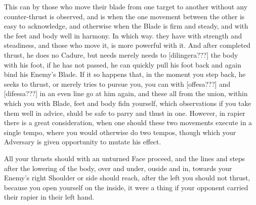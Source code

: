 This can by those who move their blade from one target to another
without any counter-thrust is
observed, and is when the one movement between the other is easy to
acknowledge, and otherwise when the Blade is firm and steady, and with
the feet and body well in harmony. In which way. they have with
strength and steadiness, and those who move it, is more powerful with
it. And after completed thrust, he does no Cadure, but needs merely
needs to [dilingera???] the body with his foot, if he has not passed,
he can quickly pull his foot back and again bind his Enemy's Blade. If
it so happens that, in the moment you step back, he seeks to thrust,
or merely tries to pursue you, you can with [offesa???] and
[difessa???] in an even line go at him again, and these all from the
union, within which you with Blade, feet and body fidn yourself, which
observations if you take them well in advice, shuld be safe to parry
and thust in one. However, in rapier there is a great consideration,
when one should these two movements execute in a single tempo, where
you would otherwise do two tempos, though which your Adversary is
given opportunity to mutate his effect.


All your thrusts should with an unturned Face proceed, and the lines
and steps after the lowering of the body, over and under, ouside and
in, towards your Enemy's right Shoulder or side should reach, after
the left you should not thrust, because you open yourself on the
inside, it were a thing if your opponent carried their rapier in their
left hand.
